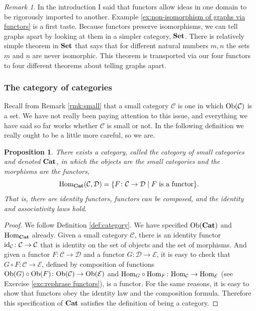 \documentclass{book}
\def\tn{\textnormal}
\def\mc{\mathcal}
\def\Hom{\tn{Hom}}
\def\Ob{\tn{Ob}}
\def\to{\rightarrow}
\def\taking{\colon}
\def\|{{\;|\;}}
\def\ul{\underline}
\def\id{\tn{id}}
\def\Cat{{\bf Cat}}
\def\Set{{\bf Set}}
\def\mcC{\mc{C}}
\def\mcD{\mc{D}}
\def\mcE{\mc{E}}
\newtheorem{proposition}[subsubsection]{Proposition}
\theoremstyle{remark}
\newtheorem{remark}[subsubsection]{Remark}
\theoremstyle{definition}
\begin{document}
\begin{remark}

In the introduction I said that functors allow ideas in one domain to be rigorously imported to another. Example \ref{ex:non-isomorphism of graphs via functors} is a first taste. Because functors preserve isomorphisms, we can tell graphs apart by looking at them in a simpler category, $\Set$. There is relatively simple theorem in $\Set$ that says that for different natural numbers $m,n$ the sets $\ul{m}$ and $\ul{n}$ are never isomorphic. This theorem is transported via our four functors to four different theorems about telling graphs apart.

\end{remark}


\subsubsection{The category of categories}\label{sec:cat of cats}

Recall from Remark \ref{rmk:small} that a small category $\mcC$ is one in which $\Ob(\mcC)$ is a set. We have not really been paying attention to this issue, and everything we have said so far works whether $\mcC$ is small or not. In the following definition we really ought to be a little more careful, so we are. 

\begin{proposition}\index{a category!$\Cat$}

There exists a category, called {\em the category of small categories} and denoted $\Cat$, in which the objects are the small categories and the morphisms are the functors, $$\Hom_\Cat(\mcC,\mcD)=\{F\taking\mcC\to\mcD\| F \tn{ is a functor}\}.$$ That is, there are identity functors, functors can be composed, and the identity and associativity laws hold.
 
\end{proposition}

\begin{proof}

We follow Definition \ref{def:category}. We have specified $\Ob(\Cat)$ and $\Hom_\Cat$ already. Given a small category $\mcC$, there is an identity functor $\id_\mcC\taking\mcC\to\mcC$ that is identity on the set of objects and the set of morphisms. And given a functor $F\taking\mcC\to\mcD$ and a functor $G\taking\mcD\to\mcE$, it is easy to check that $G\circ F\taking \mcC\to\mcE$, defined by composition of functions $\Ob(G)\circ\Ob(F)\taking\Ob(\mcC)\to\Ob(\mcE)$ and $\Hom_G\circ\Hom_F\taking\Hom_\mcC\to\Hom_\mcE$ (see Exercise \ref{exc:rephrase functors}), is a functor. For the same reasons, it is easy to show that functors obey the identity law and the composition formula. Therefore this specification of $\Cat$ satisfies the definition of being a category. 

\end{proof}
\end{document}
